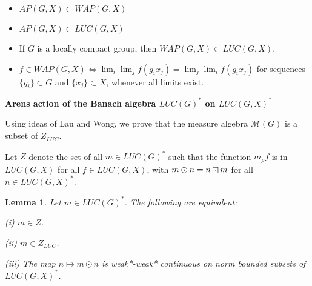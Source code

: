\documentclass[landscape]{slides}
\newtheorem{lemma}[defn]{Lemma}
\begin{document}
\begin{slide}
\begin{itemize}
\item $AP(G,X) \subset WAP(G,X)$
\item $AP(G,X) \subset LUC(G,X)$
\item If $G$ is a locally compact group, then $WAP(G,X) \subset LUC(G,X)$.
\item $f\in WAP(G,X) \Leftrightarrow \lim_i \lim_j f(g_i x_j) = \lim_j \lim_i f(g_i x_j)$ for sequences $\{g_i\}\subset G$ and $\{x_j\}\subset X$,  whenever all limits exist.
\end{itemize}
\end{slide}

\begin{slide}
{\bf Arens action of the Banach algebra $LUC(G)^*$ on $LUC(G,X)^*$}

Using ideas of Lau and Wong, we prove that the measure algebra
$\mathcal{M}(G)$ is a subset of $Z_{LUC}$.

Let $Z$ denote the set of all $m\in LUC(G)^*$ such that the function $m_\rho f$ is in $LUC(G,X)$
for all $f\in LUC(G,X)$, with $m\odot n = n\dotbox m$ for all $n\in LUC(G,X)^*$.\\

\begin{lemma}\label{lau:arens}
Let $m \in LUC(G)^*$.  The following are equivalent:
\begin{list}{}{\itemsep -8pt \topsep -8pt}
\item[(i)] $m\in Z$.
\item[(ii)] $m\in Z_{LUC}$.
\item[(iii)] The map $n\mapsto m\odot n$ is weak*-weak* continuous on norm bounded subsets of $LUC(G,X)^*$.
\end{list}
\end{lemma}
\end{slide}
\end{document}
